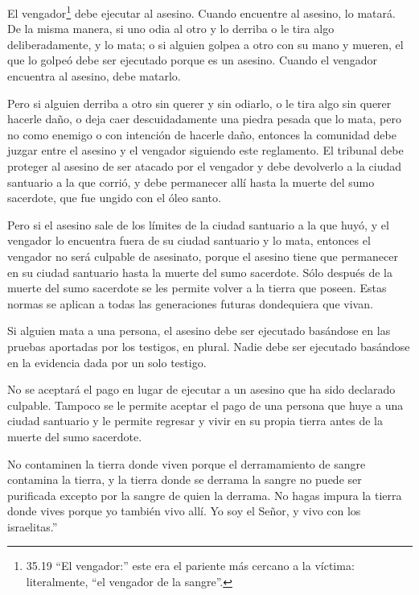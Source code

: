 El vengador\footnote{35.19 ``El vengador:'' este era el
  pariente más cercano a la víctima: literalmente, ``el vengador de la
  sangre''.} debe ejecutar al asesino. Cuando encuentre al asesino, lo
matará.  De la misma manera, si uno odia al otro y lo
derriba o le tira algo deliberadamente, y lo mata;  o si
alguien golpea a otro con su mano y mueren, el que lo golpeó debe ser
ejecutado porque es un asesino. Cuando el vengador encuentra al asesino,
debe matarlo.

 Pero si alguien derriba a otro sin querer y sin odiarlo, o
le tira algo sin querer hacerle daño,  o deja caer
descuidadamente una piedra pesada que lo mata, pero no como enemigo o
con intención de hacerle daño,  entonces la comunidad debe
juzgar entre el asesino y el vengador siguiendo este reglamento.
 El tribunal debe proteger al asesino de ser atacado por el
vengador y debe devolverlo a la ciudad santuario a la que corrió, y debe
permanecer allí hasta la muerte del sumo sacerdote, que fue ungido con
el óleo santo.

 Pero si el asesino sale de los límites de la ciudad
santuario a la que huyó,  y el vengador lo encuentra fuera
de su ciudad santuario y lo mata, entonces el vengador no será culpable
de asesinato,  porque el asesino tiene que permanecer en su
ciudad santuario hasta la muerte del sumo sacerdote. Sólo después de la
muerte del sumo sacerdote se les permite volver a la tierra que poseen.
 Estas normas se aplican a todas las generaciones futuras
dondequiera que vivan.

 Si alguien mata a una persona, el asesino debe ser
ejecutado basándose en las pruebas aportadas por los testigos, en
plural. Nadie debe ser ejecutado basándose en la evidencia dada por un
solo testigo.

 No se aceptará el pago en lugar de ejecutar a un asesino
que ha sido declarado culpable.  Tampoco se le permite
aceptar el pago de una persona que huye a una ciudad santuario y le
permite regresar y vivir en su propia tierra antes de la muerte del sumo
sacerdote.

 No contaminen la tierra donde viven porque el
derramamiento de sangre contamina la tierra, y la tierra donde se
derrama la sangre no puede ser purificada excepto por la sangre de quien
la derrama.  No hagas impura la tierra donde vives porque
yo también vivo allí. Yo soy el Señor, y vivo con los israelitas.''

